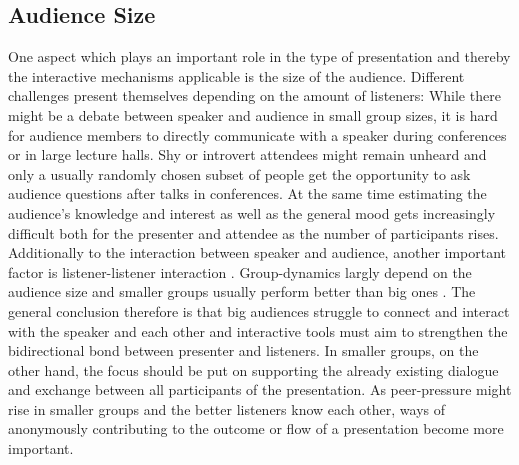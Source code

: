 \subsection{Audience Size}
One aspect which plays an important role in the type of presentation and thereby the interactive mechanisms applicable is the size of the audience. Different challenges present themselves depending on the amount of listeners: While there might be a debate between speaker and audience in small group sizes, it is hard for audience members to directly communicate with a speaker during conferences or in large lecture halls. Shy or introvert attendees might remain unheard \cite{Bry:Backstage} and only a usually randomly chosen subset of people get the opportunity to ask audience questions after talks in conferences. At the same time estimating the audience's knowledge and interest as well as the general mood gets increasingly difficult both for the presenter and attendee as the number of participants rises. Additionally to the interaction between speaker and audience, another important factor is listener-listener interaction \cite{Moore:ThreeTypesOfInteraction}. Group-dynamics largly depend on the audience size and smaller groups usually perform better than big ones \cite{Phillips:GroupProblemSolving}.
The general conclusion therefore is that big audiences struggle to connect and interact with the speaker and each other and interactive tools must aim to strengthen the bidirectional bond between presenter and listeners. In smaller groups, on the other hand, the focus should be put on supporting the already existing dialogue and exchange between all participants of the presentation. As peer-pressure might rise in smaller groups and the better listeners know each other, ways of anonymously contributing to the outcome or flow of a presentation become more important.

